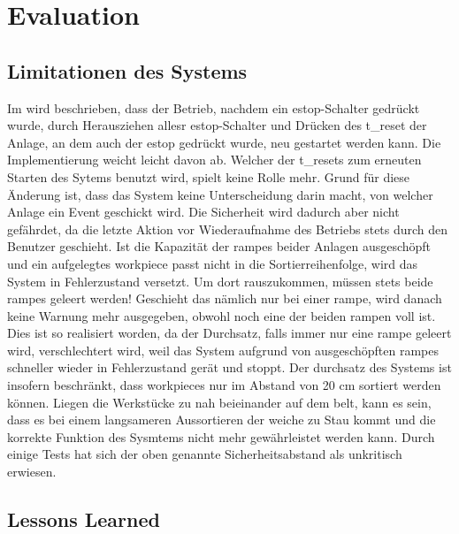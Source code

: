 \chapter{Evaluation}\label{ch:evaluation}


\section{Limitationen des Systems}\label{sec:limitations}

Im  wird beschrieben, dass der Betrieb, nachdem ein \gls{estop}-Schalter gedrückt wurde, durch Herausziehen allesr
\gls{estop}-Schalter und Drücken des \gls{t_reset}
der Anlage, an dem auch der \gls{estop} gedrückt wurde, neu gestartet werden kann. Die Implementierung weicht leicht davon
ab. Welcher der \glspl{t_reset} zum erneuten Starten des Sytems benutzt wird, spielt keine Rolle mehr. Grund für diese Änderung ist, dass das
System keine Unterscheidung darin macht, von welcher Anlage ein Event geschickt wird. Die Sicherheit wird dadurch aber nicht gefährdet, da die letzte Aktion vor Wiederaufnahme des Betriebs
stets durch den Benutzer geschieht.
Ist die Kapazität der \glspl{rampe} beider Anlagen ausgeschöpft und ein aufgelegtes \gls{workpiece} passt nicht in die
Sortierreihenfolge, wird das System in Fehlerzustand versetzt. Um dort rauszukommen, müssen stets beide \glspl{rampe} geleert
werden! Geschieht das nämlich nur bei einer \gls{rampe}, wird danach keine Warnung mehr ausgegeben, obwohl noch eine der
beiden \gls{rampe}n voll ist. Dies ist so realisiert worden, da der Durchsatz, falls immer nur eine \gls{rampe} geleert wird,
verschlechtert wird, weil das System aufgrund von ausgeschöpften \glspl{rampe} schneller wieder in Fehlerzustand gerät und
stoppt.
Der \gls{durchsatz} des Systems ist insofern beschränkt, dass \glspl{workpiece} nur im Abstand von 20 cm sortiert werden können.
Liegen die Werkstücke zu nah beieinander auf dem \gls{belt}, kann es sein, dass es bei einem langsameren Aussortieren
der \gls{weiche} zu Stau kommt und die korrekte Funktion des Sysmtems nicht mehr gewährleistet werden kann.
Durch einige Tests hat sich der oben genannte Sicherheitsabstand als unkritisch erwiesen.

\section{Lessons Learned}\label{sec:lessons-learned}
